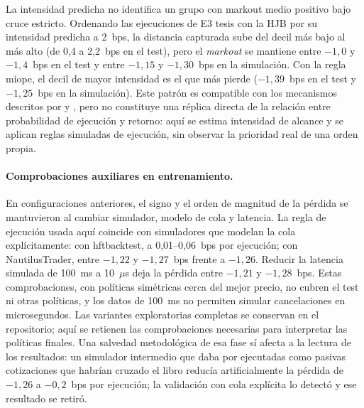 La intensidad predicha no identifica un grupo con markout medio positivo bajo cruce estricto. Ordenando las ejecuciones de E3 tesis con la HJB por su intensidad predicha a 2~bps, la distancia capturada sube del decil más bajo al más alto (de 0,4 a 2,2~bps en el test), pero el \textit{markout} se mantiene entre $-1{,}0$ y $-1{,}4$~bps en el test y entre $-1{,}15$ y $-1{,}30$~bps en la simulación. Con la regla miope, el decil de mayor intensidad es el que más pierde ($-1{,}39$~bps en el test y $-1{,}25$~bps en la simulación). Este patrón es compatible con los mecanismos descritos por \citet{AlbersEtAl2025} y \citet{DeLise2024}, pero no constituye una réplica directa de la relación entre probabilidad de ejecución y retorno: aquí se estima intensidad de alcance y se aplican reglas simuladas de ejecución, sin observar la prioridad real de una orden propia.

\paragraph{Comprobaciones auxiliares en entrenamiento.} En configuraciones anteriores, el signo y el orden de magnitud de la pérdida se mantuvieron al cambiar simulador, modelo de cola y latencia. La regla de ejecución usada aquí coincide con simuladores que modelan la cola explícitamente: con hftbacktest, a 0,01--0,06~bps por ejecución; con NautilusTrader, entre $-1{,}22$ y $-1{,}27$~bps frente a $-1{,}26$. Reducir la latencia simulada de 100~ms a 10~$\mu$s deja la pérdida entre $-1{,}21$ y $-1{,}28$~bps. Estas comprobaciones, con políticas simétricas cerca del mejor precio, no cubren el test ni otras políticas, y los datos de 100~ms no permiten simular cancelaciones en microsegundos. Las variantes exploratorias completas se conservan en el repositorio; aquí se retienen las comprobaciones necesarias para interpretar las políticas finales. Una salvedad metodológica de esa fase sí afecta a la lectura de los resultados: un simulador intermedio que daba por ejecutadas como pasivas cotizaciones que habrían cruzado el libro reducía artificialmente la pérdida de $-1{,}26$ a $-0{,}2$~bps por ejecución; la validación con cola explícita lo detectó y ese resultado se retiró.

